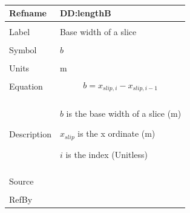 \documentclass[12pt]{article}
\begin{document}
~\newline
 \noindent \begin{minipage}{\textwidth}
\begin{tabular}{p{} p{}}
\toprule \textbf{Refname} & \textbf{DD:lengthB}
\label{DD:lengthB}
\\ \midrule \\
Label & Base width of a slice
        \\ \midrule \\
        Symbol & $b$
                 \\ \midrule \\
                 Units & m
                         \\ \midrule \\
                         Equation & \begin{displaymath}
                                    b={x_{slip,i}}-{x_{slip,i-1}}
                                    \end{displaymath}
                                    \\ \midrule \\
                                    Description & \begin{symbDescription}
                                                  \item{$b$ is the base width of a slice (m)}
                                                  \item{${x_{slip}}$ is the x ordinate (m)}
                                                  \item{$i$ is the index (Unitless)}
                                                  \end{symbDescription}
                                                  \\ \midrule \\
                                                  Source & \cite{fredlund1977}
                                                           \\ \midrule \\
                                                           RefBy & 
\\ \bottomrule \end{tabular}
\end{minipage}\\
~\newline
\end{document}
